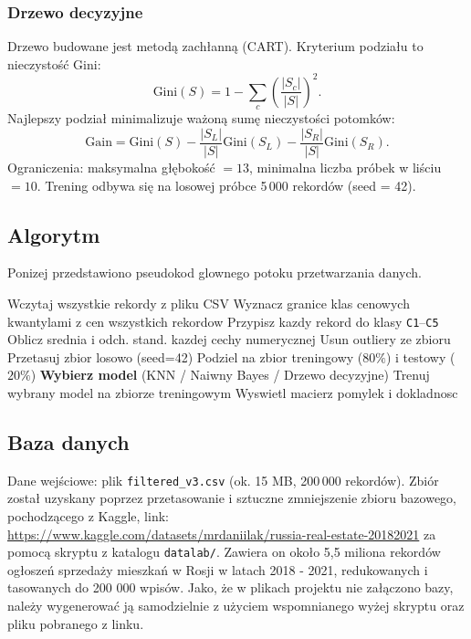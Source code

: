 \documentclass[12pt,a4paper]{article}
\begin{document}
	\subsubsection{Drzewo decyzyjne}
	
	Drzewo budowane jest metodą zachłanną (CART). Kryterium podziału to nieczystość Gini:
	\[
	\text{Gini}(S) = 1 - \sum_{c} \left(\frac{|S_c|}{|S|}\right)^2.
	\]
	Najlepszy podział minimalizuje ważoną sumę nieczystości potomków:
	\[
	\text{Gain} = \text{Gini}(S) - \frac{|S_L|}{|S|}\text{Gini}(S_L) - \frac{|S_R|}{|S|}\text{Gini}(S_R).
	\]
	Ograniczenia: maksymalna głębokość $= 13$, minimalna liczba próbek w liściu $= 10$.
	Trening odbywa się na losowej próbce 5\,000 rekordów (seed = 42).

	\subsection{Algorytm}

	Ponizej przedstawiono pseudokod glownego potoku przetwarzania danych.

	\begin{algorithm}[H]
		Wczytaj wszystkie rekordy z pliku CSV\;
		Wyznacz granice klas cenowych kwantylami z cen wszystkich rekordow\;
		Przypisz kazdy rekord do klasy \texttt{C1}--\texttt{C5}\;
		Oblicz srednia i odch. stand. kazdej cechy numerycznej\;
		Usun outliery ze zbioru\;
		Przetasuj zbior losowo (seed=42)\;
		Podziel na zbior treningowy ($80\%$) i testowy ($20\%$)\;
		\textbf{Wybierz model} (KNN / Naiwny Bayes / Drzewo decyzyjne)\;
		Trenuj wybrany model na zbiorze treningowym\;
		Wyswietl macierz pomylek i dokladnosc\;
		\caption{Główny potok algorytmu programu}
	\end{algorithm}

	\newpage
	\subsection{Baza danych}
	Dane wejściowe: plik \texttt{filtered\_v3.csv} (ok. 15 MB, 200\,000 rekordów). Zbiór został uzyskany poprzez przetasowanie i sztuczne zmniejszenie zbioru bazowego, pochodzącego z Kaggle, link: \href{https://www.kaggle.com/datasets/mrdaniilak/russia-real-estate-20182021}{https://www.kaggle.com/datasets/mrdaniilak/russia-real-estate-20182021} za pomocą skryptu z katalogu \texttt{datalab/}. Zawiera on około 5,5 miliona rekordów ogłoszeń sprzedaży mieszkań w Rosji w latach 2018 - 2021, redukowanych i tasowanych do 200 000 wpisów. Jako, że w plikach projektu nie załączono bazy, należy wygenerować ją samodzielnie z użyciem wspomnianego wyżej skryptu oraz pliku pobranego z linku.
	
\end{document}
